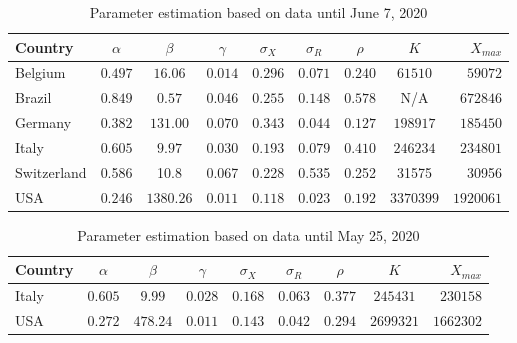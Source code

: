 \documentclass{article}
\begin{document}
\begin{table}
\begin{center}
\begin{tabular}{l|ccccccc|r}
Country & $\alpha$ & $\beta$ & $\gamma$ & $\sigma_X $ & $ \sigma_R$ & $\rho$ & $K$ & $X_{max}$ \\ \hline
Belgium & $0.497$ & $16.06$ & $0.014$ & $0.296$ & $0.071$ & $0.240$ & $61510$ & $59072$ \\
Brazil  & $0.849$ & $0.57$ & $0.046$ & $0.255$ & $0.148$ & $0.578$ & N/A & $672846$ \\
Germany & $0.382$ & $131.00$ & $0.070$ & $0.343$ & $0.044$ & $0.127$ & $198917$ & $185450$ \\
Italy  & $0.605$ & $9.97$ & $0.030$ & $0.193$ & $0.079$ & $0.410$ & $246234$ & $234801$ \\
Switzerland & 0.586	 &	10.8 & 0.067 & 0.228  & 0.535 & 0.252 & 31575&      30956	    \\
USA    & $0.246$  & $1380.26$ & $0.011$ & $0.118$ & $0.023$ & $0.192$ & $3370399$ & $1920061$ \\ \hline
\end{tabular}
\caption{
Parameter estimation based on data until June 7, 2020
\label{tablejune7}
}
\end{center}
\end{table}

\bigskip

\begin{table}
\begin{center}
\begin{tabular}{l|ccccccc|r}
Country & $\alpha$ & $\beta$ & $\gamma$ & $\sigma_X $ & $ \sigma_R$ & $\rho$ & $K$ & $X_{max}$ \\ \hline
Italy  & $0.605$ & $9.99$ & $0.028$ & $0.168$ & $0.063$ & $0.377$ & $245431$ & $230158$ \\
USA    & $0.272$  & $478.24$ & $0.011$ & $0.143$ & $0.042$ & $0.294$ & $2699321$ & $1662302$\\ \hline
\end{tabular}
\caption{
Parameter estimation based on data until May 25, 2020
\label{tablemay25}
}
\end{center}
\end{table}
\end{document}

